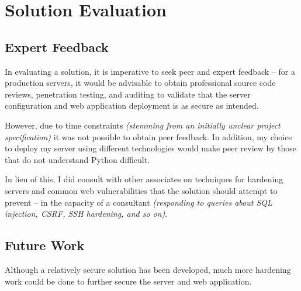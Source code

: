 \section{Solution Evaluation}
\subsection{Expert Feedback}
In evaluating a solution, it is imperative to seek peer and expert feedback -- for a production servers, it would be advisable to obtain professional source code reviews, penetration testing, and auditing to validate that the server configuration and web application deployment is as secure as intended.

However, due to time constraints \textit{(stemming from an initially unclear project specification)} it was not possible to obtain peer feedback. In addition, my choice to deploy my server using different technologies would make peer review by those that do not understand Python difficult.

In lieu of this, I did consult with other associates on techniques for hardening servers and common web vulnerabilities that the solution should attempt to prevent -- in the capacity of a consultant \textit{(responding to queries about SQL injection, CSRF, SSH hardening, and so on)}.

\subsection{Future Work}
Although a relatively secure solution has been developed, much more hardening work could be done to further secure the server and web application.

